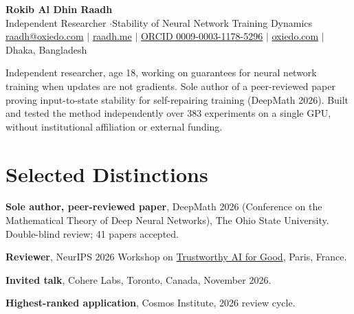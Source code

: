 \documentclass[10pt,a4paper]{article}
\begin{document}
\RaggedRight
\color{body}

\begin{center}
  {\LARGE\bfseries\color{heading} Rokib Al Dhin Raadh}\\[3pt]
  {\small Independent Researcher \enspace$\cdot$\enspace Stability of Neural Network Training Dynamics}\\[3pt]
  {\footnotesize
    \href{mailto:raadh@oxiedo.com}{raadh@oxiedo.com}
    \enspace$|$\enspace
    \href{https://www.raadh.me}{raadh.me}
    \enspace$|$\enspace
    \href{https://orcid.org/0009-0003-1178-5296}{ORCID 0009-0003-1178-5296}
    \enspace$|$\enspace
    \href{https://oxiedo.com}{oxiedo.com}
    \enspace$|$\enspace
    {\color{muted}Dhaka, Bangladesh}
  }
\end{center}
\vspace{1pt}

{\small\noindent Independent researcher, age 18, working on guarantees for neural network training when updates are not gradients. Sole author of a peer-reviewed paper proving input-to-state stability for self-repairing training (DeepMath 2026). Built and tested the method independently over 383 experiments on a single GPU, without institutional affiliation or external funding.\par}

\section*{Selected Distinctions}
\begin{bullets}
  \item \textbf{Sole author, peer-reviewed paper}, DeepMath 2026 (Conference on the Mathematical Theory of Deep Neural Networks), The Ohio State University. Double-blind review; 41 papers accepted.
  \item \textbf{Reviewer}, NeurIPS 2026 Workshop on \href{https://trustworthy-ai-for-good.github.io/}{Trustworthy AI for Good}, Paris, France.
  \item \textbf{Invited talk}, Cohere Labs, Toronto, Canada, November 2026.
  \item \textbf{Highest-ranked application}, Cosmos Institute, 2026 review cycle.
\end{bullets}
\end{document}
